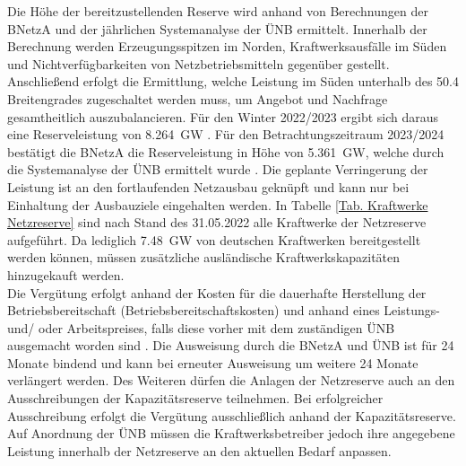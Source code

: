 			Die Höhe der bereitzustellenden Reserve wird anhand von Berechnungen der BNetzA und der jährlichen Systemanalyse der ÜNB ermittelt.
			Innerhalb der Berechnung werden Erzeugungsspitzen im Norden, Kraftwerksausfälle im Süden und Nichtverfügbarkeiten von Netzbetriebsmitteln gegenüber gestellt.
			Anschließend erfolgt die Ermittlung, welche Leistung im Süden unterhalb des \num{50,4} Breitengrades zugeschaltet werden muss, um Angebot und Nachfrage gesamtheitlich auszubalancieren.
			Für den Winter 2022/2023 ergibt sich daraus eine Reserveleistung von \SI{8,264}{\giga\watt} \cite{Bedarf_Netz_Kapa_Reserve}.
			Für den Betrachtungszeitraum 2023/2024 bestätigt die BNetzA die Reserveleistung in Höhe von \SI{5,361}{\giga\watt}, welche durch die Systemanalyse der ÜNB ermittelt wurde \cite{Bedarf_Netz_Kapa_Reserve}.		
			Die geplante Verringerung der Leistung ist an den fortlaufenden Netzausbau geknüpft und kann nur bei Einhaltung der Ausbauziele eingehalten werden. 
			In Tabelle \ref{Tab. Kraftwerke Netzreserve} sind nach Stand des 31.05.2022 alle Kraftwerke der Netzreserve aufgeführt. 
			Da lediglich \SI{7,48}{\giga\watt} von deutschen Kraftwerken bereitgestellt werden können, müssen zusätzliche ausländische Kraftwerkskapazitäten hinzugekauft werden. \\		
			
			Die Vergütung erfolgt anhand der Kosten für die dauerhafte Herstellung der Betriebsbereitschaft (Betriebsbereitschaftskosten) und anhand eines Leistungs- und/ oder Arbeitspreises, falls diese vorher mit dem zuständigen ÜNB ausgemacht worden sind \cite{EnWG}.
			Die Ausweisung durch die BNetzA und ÜNB ist für 24 Monate bindend und kann bei erneuter Ausweisung um weitere 24 Monate verlängert werden.		
			Des Weiteren dürfen die Anlagen der Netzreserve auch an den Ausschreibungen der Kapazitätsreserve teilnehmen.
			Bei erfolgreicher Ausschreibung erfolgt die Vergütung ausschließlich anhand der Kapazitätsreserve.
			Auf Anordnung der ÜNB müssen die Kraftwerksbetreiber jedoch ihre angegebene Leistung innerhalb der Netzreserve an den aktuellen Bedarf anpassen.
			
